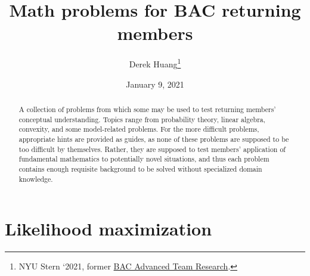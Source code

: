\documentclass{article}
\title{Math problems for BAC returning members}
\author{
    Derek Huang\thanks{
        NYU Stern `2021, former \href{
            https://sternbac.org/insightteam.html
        }{BAC Advanced Team Research}.
    }
}
\date{January 9, 2021}
\numberwithin{equation}{section}
\begin{document}
\maketitle

\begin{abstract}
    A collection of problems from which some may be used to test returning
    members' conceptual understanding. Topics range from probability theory,
    linear algebra, convexity, and some model-related problems. For the more
    difficult problems, appropriate hints are provided as guides, as none of
    these problems are supposed to be too difficult by themselves. Rather, they
    are supposed to test members' application of fundamental mathematics to
    potentially novel situations, and thus each problem contains enough
    requisite background to be solved without specialized domain knowledge.
\end{abstract}

\section{Likelihood maximization}
\end{document}
